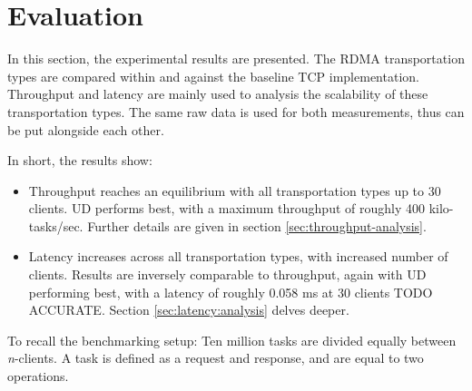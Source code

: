 
\chapter{Evaluation}\label{ch:evaluation} %



\ifpdf
    \graphicspath{{figures/PNG}}
\else
    \graphicspath{{7/figures/EPS/}{7/figures/}}
\fi


% 
In this section, the experimental results are presented.
The RDMA transportation types are compared within and against the baseline TCP implementation.
Throughput and latency are mainly used to analysis the scalability of these transportation types.
The same raw data is used for both measurements, thus can be put alongside each other.

In short, the results show:
\begin{itemize}
    \item Throughput reaches an equilibrium with all transportation types up to 30 clients.
    UD performs best, with a maximum throughput of roughly 400 kilo-tasks/sec.
    Further details are given in section \ref{sec:throughput-analysis}.
    \item Latency increases across all transportation types, with increased number of clients.
    Results are inversely comparable to throughput, again with UD performing best, with a latency of roughly 0.058 ms at 30 clients TODO ACCURATE.
    Section \ref{sec:latency:analysis} delves deeper.
\end{itemize}

To recall the benchmarking setup:
Ten million tasks are divided equally between \textit{n}-clients.
A task is defined as a request and response, and are equal to two operations.

